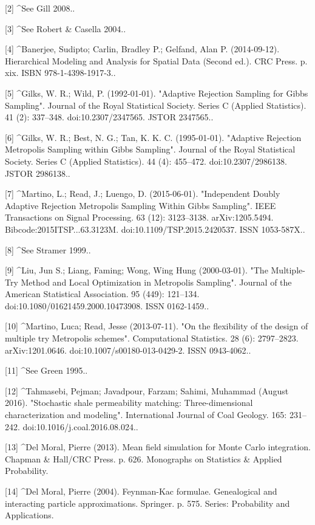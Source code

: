 [2]
^See Gill 2008..

[3]
^See Robert & Casella 2004..

[4]
^Banerjee, Sudipto; Carlin, Bradley P.; Gelfand, Alan P. (2014-09-12). Hierarchical Modeling and Analysis for Spatial Data (Second ed.). CRC Press. p. xix. ISBN 978-1-4398-1917-3..

[5]
^Gilks, W. R.; Wild, P. (1992-01-01). "Adaptive Rejection Sampling for Gibbs Sampling". Journal of the Royal Statistical Society. Series C (Applied Statistics). 41 (2): 337–348. doi:10.2307/2347565. JSTOR 2347565..

[6]
^Gilks, W. R.; Best, N. G.; Tan, K. K. C. (1995-01-01). "Adaptive Rejection Metropolis Sampling within Gibbs Sampling". Journal of the Royal Statistical Society. Series C (Applied Statistics). 44 (4): 455–472. doi:10.2307/2986138. JSTOR 2986138..

[7]
^Martino, L.; Read, J.; Luengo, D. (2015-06-01). "Independent Doubly Adaptive Rejection Metropolis Sampling Within Gibbs Sampling". IEEE Transactions on Signal Processing. 63 (12): 3123–3138. arXiv:1205.5494. Bibcode:2015ITSP...63.3123M. doi:10.1109/TSP.2015.2420537. ISSN 1053-587X..

[8]
^See Stramer 1999..

[9]
^Liu, Jun S.; Liang, Faming; Wong, Wing Hung (2000-03-01). "The Multiple-Try Method and Local Optimization in Metropolis Sampling". Journal of the American Statistical Association. 95 (449): 121–134. doi:10.1080/01621459.2000.10473908. ISSN 0162-1459..

[10]
^Martino, Luca; Read, Jesse (2013-07-11). "On the flexibility of the design of multiple try Metropolis schemes". Computational Statistics. 28 (6): 2797–2823. arXiv:1201.0646. doi:10.1007/s00180-013-0429-2. ISSN 0943-4062..

[11]
^See Green 1995..

[12]
^Tahmasebi, Pejman; Javadpour, Farzam; Sahimi, Muhammad (August 2016). "Stochastic shale permeability matching: Three-dimensional characterization and modeling". International Journal of Coal Geology. 165: 231–242. doi:10.1016/j.coal.2016.08.024..

[13]
^Del Moral, Pierre (2013). Mean field simulation for Monte Carlo integration. Chapman & Hall/CRC Press. p. 626. Monographs on Statistics & Applied Probability.

[14]
^Del Moral, Pierre (2004). Feynman-Kac formulae. Genealogical and interacting particle approximations. Springer. p. 575. Series: Probability and Applications.

